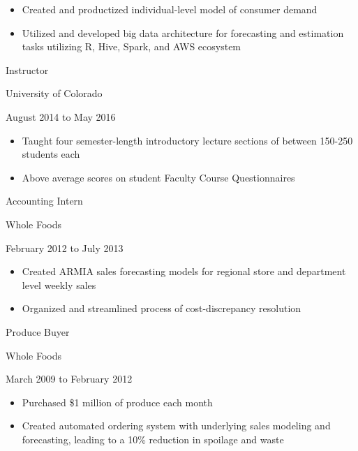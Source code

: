 \documentclass[10pt]{article} %
\begin{document}
\begin{minipage}[t]{0.46\textwidth}
\small{{\begin{itemize}

\item Created and productized individual-level model of consumer demand
\item Utilized and developed big data architecture for forecasting and estimation tasks utilizing R, Hive, Spark, and AWS ecosystem

\end{itemize}}}

\vspace{5mm}

{\raggedright \Large Instructor} \hfill
{\raggedleft University of Colorado\\}
{\raggedright \normalsize August 2014 to May 2016\par}

\small{{\begin{itemize}

\item Taught four semester-length introductory lecture sections of between 150-250 students each
\item Above average scores on student Faculty Course Questionnaires

\end{itemize}}}

\vspace{5mm}

{\raggedright \Large Accounting Intern} \hfill
{\raggedleft \normalsize Whole Foods\\}
{\raggedright \normalsize February 2012 to July 2013\par}

\small{{\begin{itemize}

\item Created ARMIA sales forecasting models  for regional store and department level weekly sales
\item Organized and streamlined process of cost-discrepancy resolution
\end{itemize}}}

\vspace{5mm}

{\raggedright \Large Produce Buyer} \hfill
{\raggedleft \normalsize Whole Foods\\}
{\raggedright \normalsize March 2009 to February 2012\par}

\small{{\begin{itemize}

\item Purchased \$1 million of produce each month
\item Created automated ordering system with underlying sales modeling and forecasting, leading to a  10\% reduction in spoilage and waste


\end{itemize}}}


\end{minipage} %
\end{document}
